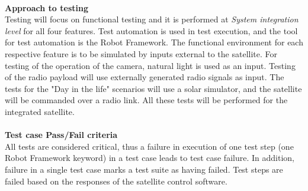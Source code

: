 \documentclass[english,12pt,a4paper,pdftex,elec,utf8]{aaltothesis}
\begin{document}
\\
\textbf{Approach to testing} 
\\
Testing will focus on functional testing and it is performed at \textit{System integration level} for all four features. Test automation is used in test execution, and the tool for test automation is the Robot Framework. The functional environment for each respective feature is to be simulated by inputs external to the satellite. For testing of the operation of the camera, natural light is used as an input. Testing of the radio payload will use externally generated radio signals as input. The tests for the "Day in the life" scenarios will use a solar simulator, and the satellite will be commanded over a radio link. All these tests will be performed for the integrated satellite.
\\
\\
\textbf{Test case Pass/Fail criteria} 
\\
All tests are considered critical, thus a failure in execution of one test step (one Robot Framework keyword) in a test case leads to test case failure. In addition, failure in a single test case marks a test suite as having failed. Test steps are failed based on the responses of the satellite control software. 
\end{document}
